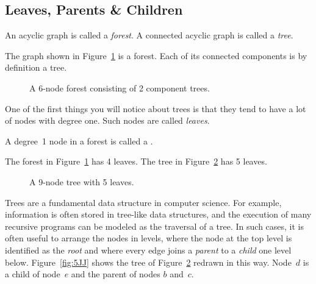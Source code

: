 \iffalse
As we have just seen, finding good cycles in a graph can be trickier than
you might first think.  But what if a graph has no cycles at all?  Sounds
pretty dull.
  But graphs without cycles, called \emph{acyclic graphs}, are
probably the most important graphs of all when it comes to computer
science.\fi

\subsection{Leaves, Parents \& Children}

\begin{definition}\label{def:tree}
An acyclic graph is called a \emph{forest}.  A connected acyclic graph
is called a \emph{tree}.
\end{definition}

The graph shown in Figure~\ref{fig:5I} is a forest.  Each of its
connected components is by definition a tree.

\begin{figure}


\caption{A 6-node forest consisting of 2 component trees.}
\label{fig:5I}
\end{figure}

One of the first things you will notice about trees is that they tend
to have a lot of nodes with degree one.  Such nodes are called
\emph{leaves}.

\begin{definition}
A degree~1 node in a forest is called a .
\end{definition}

The forest in Figure~\ref{fig:5I} has 4 leaves.  The tree in
Figure~\ref{fig:5H} has 5 leaves.
\begin{figure}


\caption{A 9-node tree with 5 leaves.}

\label{fig:5H}
\end{figure}

Trees are a fundamental data structure in computer science.  For
example, information is often stored in tree-like data structures, and
the execution of many recursive programs can be modeled as the
traversal of a tree.  In such cases, it is often useful to arrange the
nodes in levels, where the node at the top level is identified as
the \emph{root} and where every edge joins a \emph{parent} to a
\emph{child} one level below.  Figure~\ref{fig:5JJ} shows the tree of
Figure~\ref{fig:5H} redrawn in this way.  Node~$d$ is a child of
node~$e$ and the parent of nodes $b$ and~$c$.

